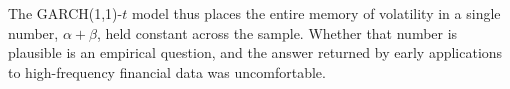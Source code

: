 The GARCH(1,1)-$t$ model thus places the entire memory of volatility in a single number, $\alpha + \beta$, held constant across the sample. Whether that number is plausible is an empirical question, and the answer returned by early applications to high-frequency financial data was uncomfortable.

